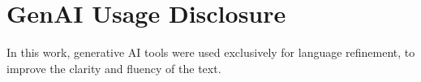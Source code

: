 \section{GenAI Usage Disclosure}
\label{sec:genai-usage}

In this work, generative AI tools were used exclusively for language refinement, to improve the clarity and fluency of the text.